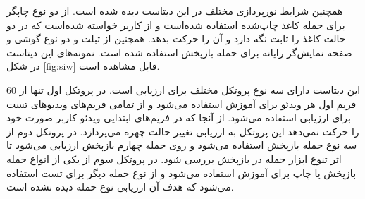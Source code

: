  همچنین شرایط نورپردازی مختلف در این دیتاست دیده شده است. از دو نوع چاپگر برای حمله کاغذ چاپ‌شده استفاده شده‌است و از کاربر خواسته شده‌است که در دو حالت کاغذ را ثابت نگه دارد و آن را حرکت بدهد. همچنین از تبلت و دو نوع گوشی و صفحه نمایش‌گر رایانه برای حمله بازپخش استفاده شده است. نمونه‌های این دیتاست در  شکل 
\ref{fig:siw}
قابل مشاهده است. 


این دیتاست دارای سه نوع پروتکل مختلف برای ارزیابی است. در پروتکل اول تنها از 60 فریم اول هر ویدئو برای آموزش استفاده می‌شود و از تمامی فریم‌های ویدیوهای تست برای ارزیابی استفاده می‌شود. از آنجا که در فریم‌های ابتدایی ویدئو کاربر صورت خود را حرکت نمی‌دهد این پروتکل به ارزیابی تغییر حالت چهره می‌پردازد. در پروتکل دوم از سه نوع حمله بازپخش استفاده می‌شود و روی حمله چهارم بازپخش ارزیابی می‌شود تا اثر تنوع ابزار حمله در بازپخش بررسی شود. در پروتکل سوم از یکی از انواع حمله بازپخش یا چاپ برای آموزش استفاده می‌شود و از نوع حمله دیگر برای تست استفاده می‌شود که هدف آن ارزیابی نوع حمله دیده نشده است. 





 











 












